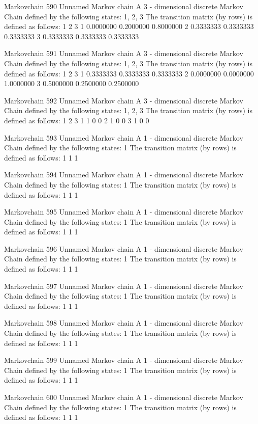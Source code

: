 \documentclass[
  nojss]{jss}
\begin{document}
\begin{CodeChunk}
\begin{CodeOutput}
Markovchain  590 
Unnamed Markov chain 
 A  3 - dimensional discrete Markov Chain defined by the following states: 
 1, 2, 3 
 The transition matrix  (by rows)  is defined as follows: 
          1         2         3
1 0.0000000 0.2000000 0.8000000
2 0.3333333 0.3333333 0.3333333
3 0.3333333 0.3333333 0.3333333

Markovchain  591 
Unnamed Markov chain 
 A  3 - dimensional discrete Markov Chain defined by the following states: 
 1, 2, 3 
 The transition matrix  (by rows)  is defined as follows: 
          1         2         3
1 0.3333333 0.3333333 0.3333333
2 0.0000000 0.0000000 1.0000000
3 0.5000000 0.2500000 0.2500000

Markovchain  592 
Unnamed Markov chain 
 A  3 - dimensional discrete Markov Chain defined by the following states: 
 1, 2, 3 
 The transition matrix  (by rows)  is defined as follows: 
  1 2 3
1 1 0 0
2 1 0 0
3 1 0 0

Markovchain  593 
Unnamed Markov chain 
 A  1 - dimensional discrete Markov Chain defined by the following states: 
 1 
 The transition matrix  (by rows)  is defined as follows: 
  1
1 1

Markovchain  594 
Unnamed Markov chain 
 A  1 - dimensional discrete Markov Chain defined by the following states: 
 1 
 The transition matrix  (by rows)  is defined as follows: 
  1
1 1

Markovchain  595 
Unnamed Markov chain 
 A  1 - dimensional discrete Markov Chain defined by the following states: 
 1 
 The transition matrix  (by rows)  is defined as follows: 
  1
1 1

Markovchain  596 
Unnamed Markov chain 
 A  1 - dimensional discrete Markov Chain defined by the following states: 
 1 
 The transition matrix  (by rows)  is defined as follows: 
  1
1 1

Markovchain  597 
Unnamed Markov chain 
 A  1 - dimensional discrete Markov Chain defined by the following states: 
 1 
 The transition matrix  (by rows)  is defined as follows: 
  1
1 1

Markovchain  598 
Unnamed Markov chain 
 A  1 - dimensional discrete Markov Chain defined by the following states: 
 1 
 The transition matrix  (by rows)  is defined as follows: 
  1
1 1

Markovchain  599 
Unnamed Markov chain 
 A  1 - dimensional discrete Markov Chain defined by the following states: 
 1 
 The transition matrix  (by rows)  is defined as follows: 
  1
1 1

Markovchain  600 
Unnamed Markov chain 
 A  1 - dimensional discrete Markov Chain defined by the following states: 
 1 
 The transition matrix  (by rows)  is defined as follows: 
  1
1 1


\end{CodeOutput}
\end{CodeChunk}
\end{document}

